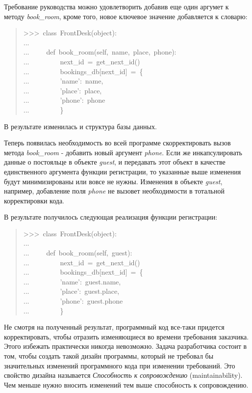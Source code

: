 \documentclass[14pt,a4paper,openany,twoside,final]{extbook}
\providecommand*{\DUroletitlereference}[1]{\textsl{#1}}
\begin{document}
Требование руководства можно удовлетворить добавив еще один аргумет к
методу \DUroletitlereference{book\_room}, кроме того, новое ключевое значение добавляется к
словарю:

\begin{quote}{\ttfamily \raggedright \noindent
>{}>{}>~class~FrontDesk(object):\\
...\\
...~~~~~def~book\_room(self,~name,~place,~phone):\\
...~~~~~~~~~next\_id~=~get\_next\_id()\\
...~~~~~~~~~bookings\_db{[}next\_id{]}~=~\{\\
...~~~~~~~~~'name':~name,\\
...~~~~~~~~~'place':~place,\\
...~~~~~~~~~'phone':~phone\\
...~~~~~~~~~\}
}
\end{quote}

В результате изменилась и структура базы данных.

Теперь появилась необходимость во всей программе скорректировать вызов
метода \DUroletitlereference{book\_room} - добавить новый аргумент \DUroletitlereference{phone}.  Если же
инкапсулировать данные о постояльце в объекте \DUroletitlereference{guest}, и передавать
этот объект в качестве единственного аргумента функции регистрации, то
указанные выше изменения будут минимизированы или вовсе не нужны.
Изменения в объекте \DUroletitlereference{guest}, например, добавление поля \DUroletitlereference{phone} не
вызовет необходимости в тотальной корректировки кода.

В результате получилось следующая реализация функции регистрации:

\begin{quote}{\ttfamily \raggedright \noindent
>{}>{}>~class~FrontDesk(object):\\
...\\
...~~~~~def~book\_room(self,~guest):\\
...~~~~~~~~~next\_id~=~get\_next\_id()\\
...~~~~~~~~~bookings\_db{[}next\_id{]}~=~\{\\
...~~~~~~~~~'name':~guest.name,\\
...~~~~~~~~~'place':~guest.place,\\
...~~~~~~~~~'phone':~guest.phone\\
...~~~~~~~~~\}
}
\end{quote}

Не смотря на полученный результат, программный код все-таки придется
корректировать, чтобы отразить изменяющиеся во времени требования
заказчика.  Этого избежать практически никогда невозможно.  Задача
разработчика состоит в том, чтобы создать такой дизайн программы,
который не требовал бы значительных изменений программного кода при
изменении требований.  Это свойство дизайна называется
\DUroletitlereference{Способность к сопровождению} (maintainability).  Чем меньше нужно вносить
изменений тем выше способность к сопровождению.
\end{document}
